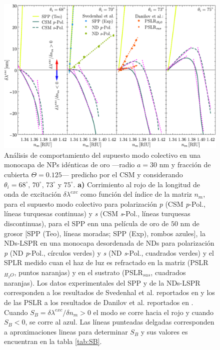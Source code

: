 \begin{figure}[b!]\centering
	\includegraphics[width=\linewidth]{2-Resultados/figs/11-SPPCSM/1_comparacionAugtEye.pdf}\vspace*{-.7em}
	\caption{ Análisis de comportamiento del supuesto modo colectivo en una monocapa de NPs idénticas de oro ---radio $a=30$ nm y fracción de cubierta $\Theta=0.125$--- predicho por el CSM y  considerando $\theta_i=68^\circ,\, 70^\circ,\, 73^\circ$ y $75^\circ$. \textbf{a)} Corrimiento al rojo de la longitud de onda de excitación $\delta\lambda^{exc}$ como función del índice de la matriz $n_m$, para el supuesto modo colectivo para polarización  \emph{p} (CSM \textit{p}-Pol., líneas turquesas continuas) y \emph{s} (CSM \textit{s}-Pol., líneas turquesas discontinuas), para el SPP enn una película de oro de $50$ nm de grosor [SPP (Teo), líneas moradas; SPP (Exp), rombos azules], la NDs-LSPR  en una monocapa desordenada de NDs para polarización \emph{p} (ND \textit{p}-Pol., círculos verdes) y \emph{s} (ND \textit{s}-Pol., cuadrados verdes) y el SPLR medido cuan el haz de luz es refractado en la matriz (PSLR$_{H_{2}O}$, puntos naranjas) y en el sustrato (PSLR$_{sus}$, cuadrados naranjas). Los datos experimentales del SPP y de la NDs-LSPR corresponden a los resultados de Svedenhal et al. reportados en \cite{svedendahl2009refractometric} y los de las PSLR a los resultados de Danilov et al. reportados en \cite{danilov2018ultra}. Cuando $S_B=\delta\lambda^{exc}/\delta n_m>0$ el modo se corre hacia el rojo y cuando $S_B<0$, se corre al azul. Las líneas punteadas delgadas corresponden a aproximaciones lineas para determinar $S_B$ y sus valores es encuentran en la tabla  \ref{tab:SB}.}\label{fig:SensThetai}
	\end{figure}	

